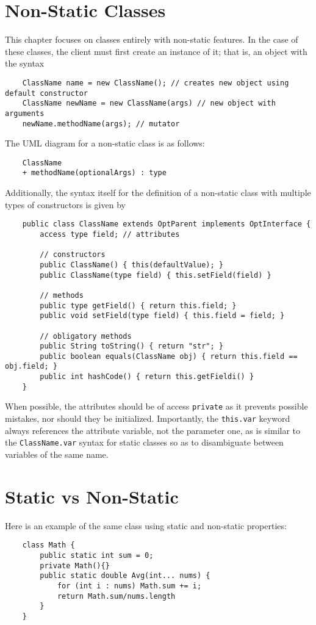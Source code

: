 \documentclass[letterpaper, openany, justified]{tufte-book}
\newcommand{\cd}[1]{\lstinline{#1}}
\begin{document}
\begin{fullwidth}
\section{Non-Static Classes}
This chapter focuses on classes entirely with non-static features. In the case of these classes, the client must first create an instance of it; that is, an object with the syntax
\begin{lstlisting}
    ClassName name = new ClassName(); // creates new object using default constructor
    ClassName newName = new ClassName(args) // new object with arguments
    newName.methodName(args); // mutator
\end{lstlisting}
The UML diagram for a non-static class is as follows:
\begin{lstlisting}
    ClassName
    + methodName(optionalArgs) : type
\end{lstlisting}
Additionally, the syntax itself for the definition of a non-static class with multiple types of constructors is given by
\lstset{frame = single}
\begin{lstlisting}
    public class ClassName extends OptParent implements OptInterface {
        access type field; // attributes

        // constructors
        public ClassName() { this(defaultValue); }
        public ClassName(type field) { this.setField(field) }

        // methods
        public type getField() { return this.field; }
        public void setField(type field) { this.field = field; }

        // obligatory methods
        public String toString() { return "str"; }
        public boolean equals(ClassName obj) { return this.field == obj.field; }
        public int hashCode() { return this.getFieldi() }
    }
\end{lstlisting}
When possible, the attributes should be of access \cd{private} as it prevents possible mistakes, nor should they be initialized. Importantly, the \cd{this.var} keyword always references the attribute variable, not the parameter one, as is similar to the \cd{ClassName.var} syntax for static classes so as to disambiguate between variables of the same name.

\section{Static vs Non-Static}
Here is an example of the same class using static and non-static properties:
\begin{multicols}{2}
\begin{lstlisting}
    class Math {
        public static int sum = 0;
        private Math(){}
        public static double Avg(int... nums) {
            for (int i : nums) Math.sum += i;
            return Math.sum/nums.length
        }
    }



\end{lstlisting}
\end{multicols}
\end{fullwidth}
\end{document}
